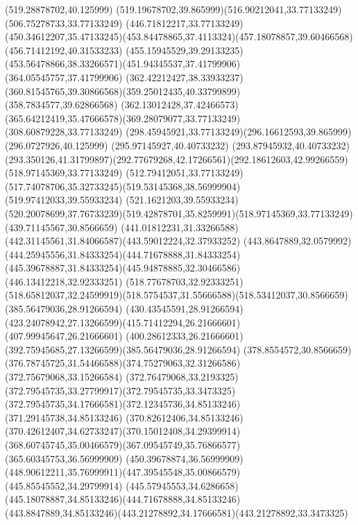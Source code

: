 {{	\lineto(519.28878702,40.125999)
	\curveto(519.19678702,39.865999)(516.90212041,33.77133249)(506.75278733,33.77133249)
	\lineto(446.71812217,33.77133249)
	\curveto(450.34612207,35.47133245)(453.84478865,37.4113324)(457.18078857,39.60466568)
	\lineto(456.71412192,40.31533233)
	\curveto(455.15945529,39.29133235)(453.56478866,38.33266571)(451.94345537,37.41799906)
	\lineto(364.05545757,37.41799906)
	\curveto(362.42212427,38.33933237)(360.81545765,39.30866568)(359.25012435,40.33799899)
	\lineto(358.7834577,39.62866568)
	\curveto(362.13012428,37.42466573)(365.64212419,35.47666578)(369.28079077,33.77133249)
	\lineto(308.60879228,33.77133249)
	\curveto(298.45945921,33.77133249)(296.16612593,39.865999)(296.0727926,40.125999)
	\lineto(295.97145927,40.40733232)
	\lineto(293.87945932,40.40733232)
	\curveto(293.350126,41.31799897)(292.77679268,42.17266561)(292.18612603,42.99266559)
	\closepath
	\moveto(518.97145369,33.77133249)
	\lineto(512.79412051,33.77133249)
	\curveto(517.74078706,35.32733245)(519.53145368,38.56999904)(519.97412033,39.55933234)
	\lineto(521.1621203,39.55933234)
	\curveto(520.20078699,37.76733239)(519.42878701,35.8259991)(518.97145369,33.77133249)
	\moveto(439.71145567,30.8566659)
	\curveto(441.01812231,31.33266588)(442.31145561,31.84066587)(443.59012224,32.37933252)
	\curveto(443.8647889,32.0579992)(444.25945556,31.84333254)(444.71678888,31.84333254)
	\curveto(445.39678887,31.84333254)(445.94878885,32.30466586)(446.13412218,32.92333251)
	\lineto(518.77678703,32.92333251)
	\curveto(518.65812037,32.24599919)(518.5754537,31.55666588)(518.53412037,30.8566659)
	\closepath
	\moveto(385.56479036,28.91266594)
	\lineto(430.43545591,28.91266594)
	\curveto(423.24078942,27.13266599)(415.71412294,26.21666601)(407.99945647,26.21666601)
	\curveto(400.28612333,26.21666601)(392.75945685,27.13266599)(385.56479036,28.91266594)
	\moveto(378.8554572,30.8566659)
	\curveto(376.78745725,31.54466588)(374.75279063,32.31266586)(372.75679068,33.15266584)
	\curveto(372.76479068,33.2193325)(372.79545735,33.27799917)(372.79545735,33.3473325)
	\curveto(372.79545735,34.17666581)(372.12345736,34.85133246)(371.29145738,34.85133246)
	\curveto(370.82612406,34.85133246)(370.42612407,34.62733247)(370.15012408,34.29399914)
	\curveto(368.60745745,35.00466579)(367.09545749,35.76866577)(365.60345753,36.56999909)
	\lineto(450.39678874,36.56999909)
	\curveto(448.90612211,35.76999911)(447.39545548,35.00866579)(445.85545552,34.29799914)
	\curveto(445.57945553,34.6286658)(445.18078887,34.85133246)(444.71678888,34.85133246)
	\curveto(443.8847889,34.85133246)(443.21278892,34.17666581)(443.21278892,33.3473325)
}}
